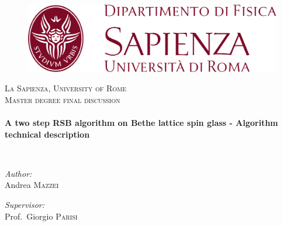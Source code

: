 \begin{titlepage}
\begin{center}

\begin{figure}

\centerline{\includegraphics{img/dip-logo-uff.png}}
\end{figure}

\textsc{\LARGE La Sapienza, University of Rome}\\[1.5cm]

\textsc{\Large Master degree final discussion}\\[0.5cm]

\HRule \\[0.4cm]
{ \huge \bfseries A two step RSB algorithm on Bethe lattice spin glass - Algorithm technical description\\[0.4cm] }

\HRule \\[1.5cm]

\begin{minipage}{0.4\textwidth}
\begin{flushleft} \large
\emph{Author:}\\
Andrea \textsc{Mazzei}
\end{flushleft}
\end{minipage}
\begin{minipage}{0.4\textwidth}
\begin{flushright} \large
\emph{Supervisor:} \\
Prof.~Giorgio \textsc{Parisi}
\end{flushright}


\date{\large \today}

\end{minipage}

\vfill

\end{center}
\end{titlepage} 